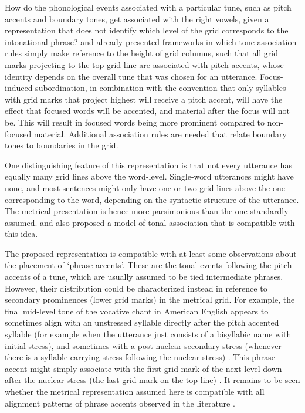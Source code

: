 \documentclass[preprint,review,12pt,authoryear,times]{elsarticle}
\begin{document}
How do the phonological events associated with a particular tune, such as pitch accents and boundary tones, get associated with the right vowels, given a representation that does not identify which level of the grid corresponds to the intonational phrase? \citet{liber75} and \citet{pierr80} already presented frameworks in which tone association rules simply make reference to the height of grid columns, such that all grid marks projecting to the top grid line are associated with pitch accents, whose identity depends on the overall tune that was chosen for an utterance. Focus-induced subordination, in combination with the convention that only syllables with grid marks that project highest will receive a pitch accent, will have the effect that focused words will be accented, and material after the focus will not be. This will result in focused words being more prominent compared to non-focused material. Additional association rules are needed that relate boundary tones to boundaries in the grid. 

One distinguishing feature of this representation is that not every utterance has equally many grid lines above the word-level. Single-word utterances might have none, and most sentences might only have one or two grid lines above the one corresponding to the word, depending on the syntactic structure of the utterance. The metrical presentation is hence more parsimonious than the one standardly assumed. \citet{gusse90} and \citet{gusse92b} also proposed a model of tonal association that is compatible with this idea.

The proposed representation is compatible with at least some observations about the placement of `phrase accents'. These are the tonal events following the pitch accents of a tune, which are usually assumed to be tied intermediate phrases. However, their distribution could be characterized instead in reference to secondary prominences (lower grid marks) in the metrical grid. For example, the final mid-level tone of the vocative chant in American English appears to sometimes align with an unstressed syllable directly after the pitch accented syllable (for example when the utterance just consists of a bisyllabic name with initial stress), and sometimes with a post-nuclear secondary stress (whenever there is a syllable carrying stress following the nuclear stress)  \citep[cf.][]{liber75,grice00}.  This phrase accent might simply associate with the first grid mark of the next level down after the nuclear stress (the last grid mark on the top line) \citep[see][153ff]{wagner05recursion}.  It remains to be seen whether the metrical representation assumed here is compatible with all alignment patterns of phrase accents observed in the literature \citep[e.g.][]{grice00,barne10}.
\end{document}

